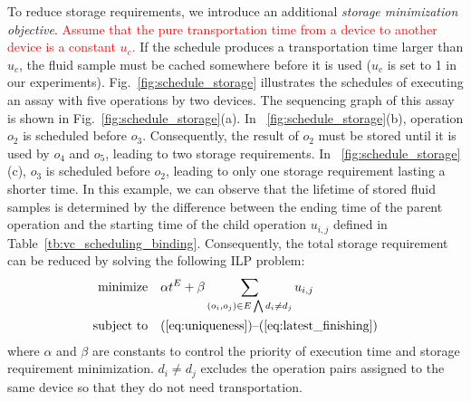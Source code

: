 

To reduce storage requirements, we introduce an additional \textit{storage minimization
objective}.
\textcolor{red}{Assume that the pure transportation time from a device to another device
is a constant $u_c$.}
If the schedule produces a transportation time larger
than $u_c$, the fluid sample must be cached somewhere before it is
used ($u_c$ is set to 1 in our experiments).
Fig.~\ref{fig:schedule_storage} illustrates
the schedules of executing an assay with five operations by two devices. The sequencing graph of this assay is shown in Fig.~\ref{fig:schedule_storage}(a).
In \figname~\ref{fig:schedule_storage}(b),
operation $o_2$ is scheduled before $o_3$. Consequently, the result of $o_2$
must be stored until it is used by $o_4$ and $o_5$, leading to two storage
requirements. %
In \figname~\ref{fig:schedule_storage}(c), $o_3$ is scheduled before $o_2$,
leading to only one storage requirement lasting a shorter time.
In this example, we can observe that
the lifetime of stored fluid samples is determined by the difference between
the ending time of the parent operation and the starting time of the child
operation $u_{i,j}$ defined in Table~\ref{tb:vc_scheduling_binding}. Consequently, the total storage requirement can be reduced by
solving the following ILP problem:
\begin{align}
\text{minimize} & \quad \alpha t^E+\beta\sum_{{(o_i,o_j)\in E\bigwedge d_i\ne d_j }}u_{i,j}
 \label{eq:minobj}\\
\text{subject to} & \quad
\text{(\ref{eq:uniqueness})--(\ref{eq:latest_finishing}})\label{eq:op_cond}
\end{align}
where $\alpha$ and $\beta$ are constants to control the priority of
execution time and storage requirement minimization.
$d_i \ne d_j $ excludes the operation pairs assigned to the same device
so that they do not need transportation.

